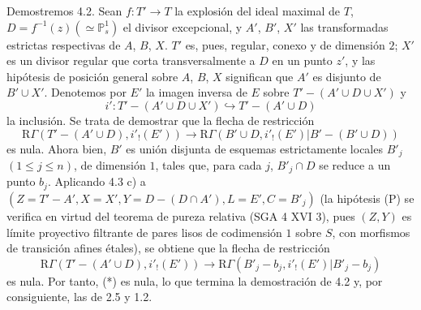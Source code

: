 Demostremos 4.2. Sean $f:T'\to T$ la explosión del ideal maximal de $T$, $D=f^{-1}(z)(\simeq\mathbb P^1_s)$ el divisor excepcional, y $A'$, $B'$, $X'$ las transformadas estrictas respectivas de $A$, $B$, $X$. $T'$ es, pues, regular, conexo y de dimensión $2$; $X'$ es un divisor regular que corta transversalmente a $D$ en un punto $z'$, y las hipótesis de posición general sobre $A$, $B$, $X$ significan que $A'$ es disjunto de $B'\cup X'$. Denotemos por $E'$ la imagen inversa de $E$ sobre $T'-(A'\cup D\cup X')$ y
\[
i':T'-(A'\cup D\cup X')\hookrightarrow T'-(A'\cup D)
\]
la inclusión. Se trata de demostrar que la flecha de restricción
\begin{equation}
\mathrm R\Gamma(T'-(A'\cup D),i'_!(E'))
\longrightarrow
\mathrm R\Gamma(B'\cup D,i'_!(E')|B'-(B'\cup D))
\tag{*}
\end{equation}
es nula. Ahora bien, $B'$ es unión disjunta de esquemas estrictamente locales $B'_j$ $(1\le j\le n)$, de dimensión $1$, tales que, para cada $j$, $B'_j\cap D$ se reduce a un punto $b_j$. Aplicando 4.3 c) a $(Z=T'-A', X=X', Y=D-(D\cap A'), L=E', C=B'_j)$ (la hipótesis (P) se verifica en virtud del teorema de pureza relativa (SGA 4 XVI 3), pues $(Z,Y)$ es límite proyectivo filtrante de pares lisos de codimensión $1$ sobre $S$, con morfismos de transición afines étales), se obtiene que la flecha de restricción
\[
\mathrm R\Gamma(T'-(A'\cup D),i'_!(E'))
\longrightarrow
\mathrm R\Gamma(B'_j-b_j,i'_!(E')|B'_j-b_j)
\]
es nula. Por tanto, (*) es nula, lo que termina la demostración de 4.2 y, por consiguiente, las de 2.5 y 1.2.
